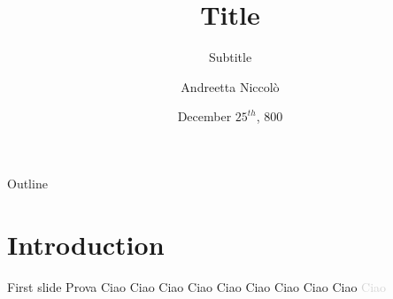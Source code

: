 \documentclass[aspectratio=169]{beamer}
\title{Title}
\subtitle{Subtitle}
\author{Andreetta Niccolò}
\date{December $25^{th}$, 800}
\begin{document}
  \maketitle

  \begin{frame}[fragile]{Outline}
    \tableofcontents
  \end{frame}

  \section{Introduction}
  \begin{frame}{First slide}{\insertsection}
    Prova
    \textcolor{NTNUBlue}{Ciao}
    \textcolor{NTNUgreen}{Ciao}
    \textcolor{NTNULightblue}{Ciao}
    \textcolor{NTNUOrange}{Ciao}
    \textcolor{NTNUPink}{Ciao}
    \textcolor{NTNUYellow}{Ciao}
    \textcolor{NTNUViolet}{Ciao}
    \textcolor{NTNUCyan}{Ciao}
    \textcolor{NTNUOcher}{Ciao}
    \textcolor{LightGrey}{Ciao}
  \end{frame}
\end{document}
